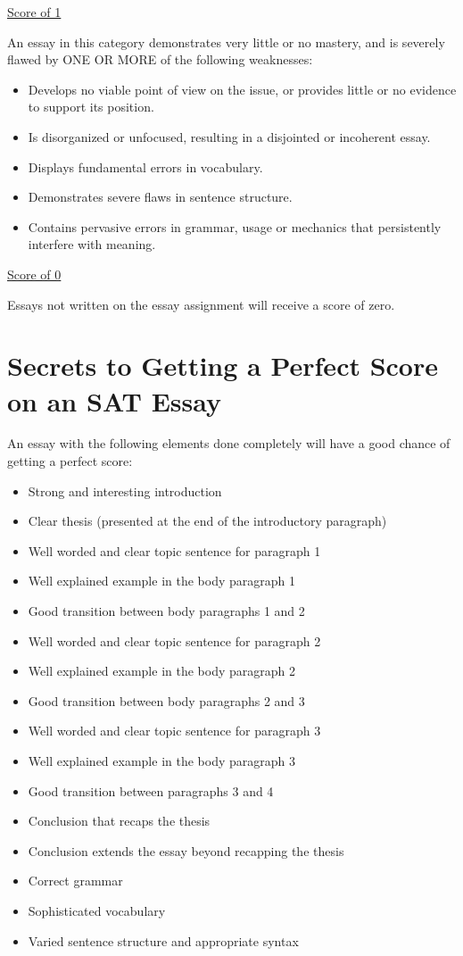 \documentclass[12pt]{book}
\begin{document}
\vfill
\underline{Score of 1}

An essay in this category demonstrates very little or no mastery, and is severely flawed by ONE OR MORE of the following weaknesses:

\begin{itemize}
\item{Develops no viable point of view on the issue, or provides little or no evidence to support its position.}
\item{Is disorganized or unfocused, resulting in a disjointed or incoherent essay.}
\item{Displays fundamental errors in vocabulary.}
\item{Demonstrates severe flaws in sentence structure.}
\item{Contains pervasive errors in grammar, usage or mechanics that persistently interfere with meaning.}
\end{itemize}

\bigskip
\underline{Score of 0}

Essays not written on the essay assignment will receive a score of zero.

\vfill
\newpage
\section[Getting A Perfect Score]{Secrets to Getting a Perfect Score on an SAT Essay}
An essay with the following elements done completely will have a good chance of getting a perfect score:

\bigskip
\begin{itemize}
\vfill\item Strong and interesting introduction
\vfill\item Clear thesis (presented at the end of the introductory paragraph)
\vfill\item Well worded and clear topic sentence for paragraph 1
\vfill\item Well explained example in the body paragraph 1
\vfill\item Good transition between body paragraphs 1 and 2
\vfill\item Well worded and clear topic sentence for paragraph 2
\vfill\item Well explained example in the body paragraph 2
\vfill\item Good transition between body paragraphs 2 and 3
\vfill\item Well worded and clear topic sentence for paragraph 3
\vfill\item Well explained example in the body paragraph 3
\vfill\item Good transition between paragraphs 3 and 4
\vfill\item Conclusion that recaps the thesis
\vfill\item Conclusion extends the essay beyond recapping the thesis
\vfill\item Correct grammar
\vfill\item Sophisticated vocabulary
\vfill\item Varied sentence structure and appropriate syntax
\end{itemize}
\vfill
\end{document}
